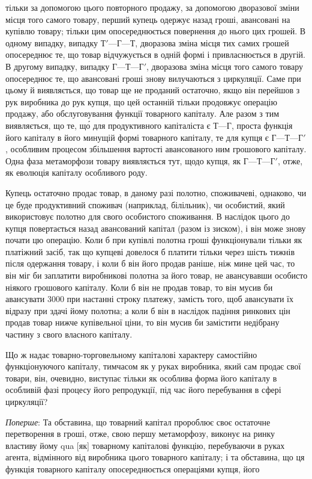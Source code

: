 \parcont{}  %
тільки за допомогою цього повторного продажу, за допомогою
дворазової зміни місця того самого товару, перший купець одержує назад гроші, авансовані на купівлю
товару; тільки цим
опосереднюється повернення до нього цих грошей. В одному
випадку, випадку $Т' — Г — Т$, дворазова зміна місця тих самих грошей опосереднює те, що товар
відчужується в одній
формі і привласнюється в другій. В другому випадку, випадку
$Г — Т — Г'$, дворазова зміна місця того самого товару опосереднює те, що авансовані гроші знову
вилучаються з циркуляції.
Саме при цьому й виявляється, що товар ще не проданий остаточно, якщо він перейшов з рук виробника
до рук купця, що
цей останній тільки продовжує операцію продажу, або обслуговування функції товарного капіталу. Але
разом з тим виявляється, що те, що́ для продуктивного капіталіста є $Т — Г$,
проста функція його капіталу в його минущій формі товарного
капіталу, те для купця є $Г — Т — Г'$, особливим процесом збільшення вартості авансованого ним
грошового капіталу. Одна
фаза метаморфози товару виявляється тут, щодо купця, як
$Г — Т — Г'$, отже, як еволюція капіталу особливого роду.

Купець остаточно продає товар, в даному разі полотно,
споживачеві, однаково, чи це буде продуктивний споживач (наприклад, білільник), чи особистий, який
використовує полотно
для свого особистого споживання. В наслідок цього до купця
повертається назад авансований капітал (разом із зиском), і він
може знову почати цю операцію. Коли б при купівлі полотна
гроші функціонували тільки як платіжний засіб, так що купцеві довелося б платити тільки через шість
тижнів після одержання товару, і коли б він його продав раніше, ніж мине цей
час, то він міг би заплатити виробникові полотна за його товар,
не авансувавши особисто ніякого грошового капіталу. Коли б він
не продав товар, то він мусив би авансувати 3000 при настанні строку платежу,
замість того, щоб авансувати їх відразу при здачі йому полотна; а коли б він в наслідок падіння
ринкових цін продав товар нижче купівельної ціни,
то він мусив би замістити недібрану частину з свого власного капіталу.

Що ж надає товарно-торговельному капіталові характеру
самостійно функціонуючого капіталу, тимчасом як у руках виробника, який сам продає свої товари, він,
очевидно, виступає
тільки як особлива форма його капіталу в особливій фазі процесу його репродукції, під час його
перебування в сфері циркуляції?

\emph{Поперше}: Та обставина, що товарний капітал пророблює своє
остаточне перетворення в гроші, отже, свою першу метаморфозу, виконує на ринку властиву йому qua
[як] товарному капіталові функцію, перебуваючи в руках агента, відмінного від
виробника цього товарного капіталу; і та обставина, що ця функція товарного капіталу опосереднюється
операціями купця, його
\parbreak{}  %
